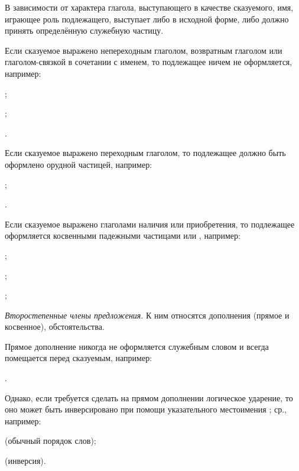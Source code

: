 В зависимости от характера глагола, выступающего в качестве сказуемого, имя, играющее роль подлежащего, выступает либо в исходной форме, либо должно принять определённую служебную частицу.

Если сказуемое выражено непереходным глаголом, возвратным глаголом или глаголом-связкой в сочетании с именем, то подлежащее ничем не оформляется, например:
\begin{prfsample}
	\item {};
	\item {};
	\item {}.
\end{prfsample}

Если сказуемое выражено переходным глаголом, то подлежащее должно быть оформлено орудной частицей, например:
\begin{prfsample}
	\item {};
	\item {}.
\end{prfsample}

Если сказуемое выражено глаголами наличия или приобретения, то подлежащее оформляется косвенными падежными частицами  или , например:
\begin{prfsample}
	\item {};
	\item {};
	\item {};
\end{prfsample}

\emph{Второстепенные члены предложения}. К ним относятся дополнения (прямое и косвенное), обстоятельства.

Прямое дополнение никогда не оформляется служебным словом и всегда помещается перед сказуемым, например:
\begin{prfsample}
	\item {}.
\end{prfsample}
Однако, если требуется сделать на прямом дополнении логическое ударение, то оно может быть инверсировано при помощи указательного местоимения ; ср., например:
\begin{prfsample}
	\item {} (обычный порядок слов);
	\item {} (инверсия).
\end{prfsample}

